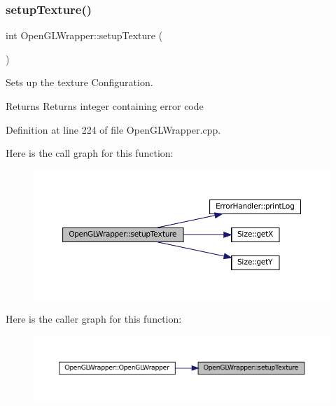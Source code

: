 \subsubsection{\texorpdfstring{setupTexture()}{setupTexture()}}
{\footnotesize\ttfamily int Open\+G\+L\+Wrapper\+::setup\+Texture (\begin{DoxyParamCaption}{ }\end{DoxyParamCaption})\hspace{0.3cm}{\ttfamily [private]}}



Sets up the texture Configuration. 

\begin{DoxyReturn}{Returns}
Returns integer containing error code 
\end{DoxyReturn}


Definition at line 224 of file Open\+G\+L\+Wrapper.\+cpp.

Here is the call graph for this function\+:\nopagebreak
\begin{figure}[H]
\begin{center}
\leavevmode
\includegraphics[width=350pt]{classOpenGLWrapper_a9f2ce92894cb84914b73349c88bb6fef_cgraph}
\end{center}
\end{figure}
Here is the caller graph for this function\+:\nopagebreak
\begin{figure}[H]
\begin{center}
\leavevmode
\includegraphics[width=350pt]{classOpenGLWrapper_a9f2ce92894cb84914b73349c88bb6fef_icgraph}
\end{center}
\end{figure}


